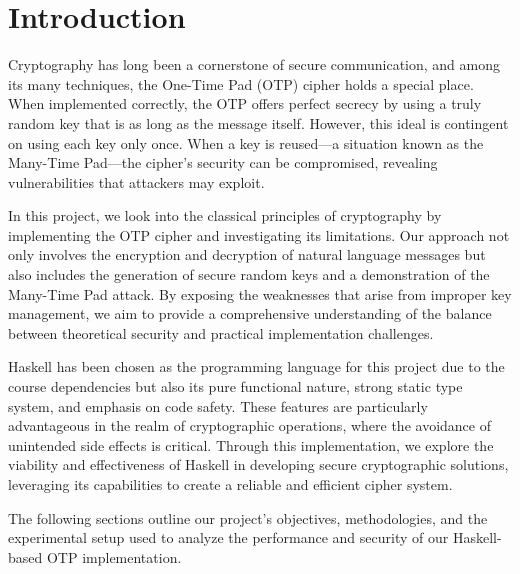 \section{Introduction}
Cryptography has long been a cornerstone of secure communication, and among its many techniques, the One-Time Pad (OTP) cipher holds a special place. When implemented correctly, the OTP offers perfect secrecy by using a truly random key that is as long as the message itself. However, this ideal is contingent on using each key only once. When a key is reused—a situation known as the Many-Time Pad—the cipher’s security can be compromised, revealing vulnerabilities that attackers may exploit.

In this project, we look into the classical principles of cryptography by implementing the OTP cipher and investigating its limitations. Our approach not only involves the encryption and decryption of natural language messages but also includes the generation of secure random keys and a demonstration of the Many-Time Pad attack. By exposing the weaknesses that arise from improper key management, we aim to provide a comprehensive understanding of the balance between theoretical security and practical implementation challenges.

Haskell has been chosen as the programming language for this project due to the course dependencies but also its pure functional nature, strong static type system, and emphasis on code safety. These features are particularly advantageous in the realm of cryptographic operations, where the avoidance of unintended side effects is critical. Through this implementation, we explore the viability and effectiveness of Haskell in developing secure cryptographic solutions, leveraging its capabilities to create a reliable and efficient cipher system.

The following sections outline our project’s objectives, methodologies, and the experimental setup used to analyze the performance and security of our Haskell-based OTP implementation.
